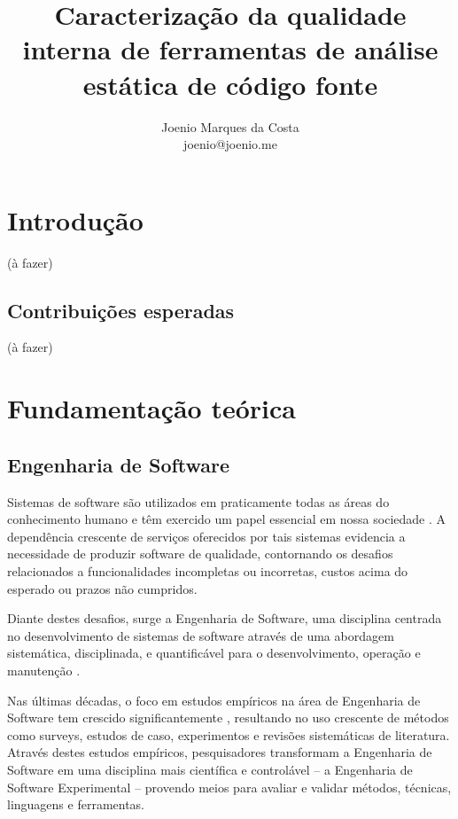 \documentclass[qual, classic, a4paper]{ufbathesis}
\title{
  Caracterização da qualidade interna de ferramentas de análise estática de
  código fonte
}
\author{Joenio Marques da Costa\\
  {\small joenio@joenio.me}
}
\begin{document}
\frontpage
\frontmatter
\presentationpage

%
%
%
%

\tableofcontents
\listoffigures
\listoftables
\mainmatter

\chapter{Introdução}

(à fazer)

\section{Contribuições esperadas}

(à fazer)

\chapter{Fundamentação teórica}

\section{Engenharia de Software}

Sistemas de software são utilizados em praticamente todas as áreas do
conhecimento humano e têm exercido um papel essencial em nossa sociedade
\cite{Mafra2006}. A dependência crescente de serviços oferecidos por tais
sistemas evidencia a necessidade de produzir software de qualidade,
contornando os  desafios relacionados a funcionalidades incompletas ou
incorretas, custos acima do esperado ou prazos não cumpridos.

Diante destes desafios, surge a Engenharia de Software, uma disciplina
centrada no desenvolvimento de sistemas de software através
de uma abordagem sistemática, disciplinada, e quantificável para o
desenvolvimento, operação e manutenção \cite{SWEBOK2014}.

Nas últimas décadas, o foco em estudos empíricos na área de Engenharia de
Software tem crescido significantemente \cite{Stol2015}, resultando no uso
crescente de métodos como surveys, estudos de caso, experimentos e revisões
sistemáticas de literatura. Através destes estudos empíricos, pesquisadores
transformam a Engenharia de Software em uma disciplina mais científica e
controlável -- a  Engenharia de Software Experimental -- provendo meios para
avaliar e validar métodos, técnicas, linguagens e ferramentas.
\end{document}
